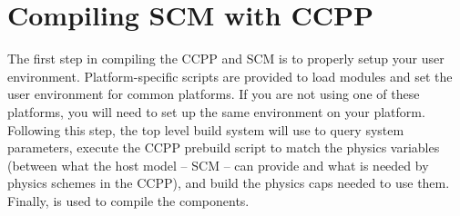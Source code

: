 \section{Compiling SCM with CCPP}
\label{section: compiling}
The first step in compiling the CCPP and SCM is to properly setup your user environment. Platform-specific scripts are provided to load modules and set the user environment for common platforms.  If you are not using one of these platforms, you will need to set up the same environment on your platform. Following this step, the top level build system will use  to query system parameters, execute the CCPP prebuild script to match the physics variables (between what the host model -- SCM -- can provide and what is needed by physics schemes in the CCPP), and build the physics caps needed to use them. Finally,  is used to compile the components. 
